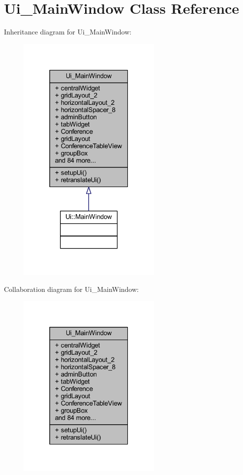 \hypertarget{class_ui___main_window}{}\section{Ui\+\_\+\+Main\+Window Class Reference}
\label{class_ui___main_window}


Inheritance diagram for Ui\+\_\+\+Main\+Window\+:
\nopagebreak
\begin{figure}[H]
\begin{center}
\leavevmode
\includegraphics[width=199pt]{class_ui___main_window__inherit__graph}
\end{center}
\end{figure}


Collaboration diagram for Ui\+\_\+\+Main\+Window\+:
\nopagebreak
\begin{figure}[H]
\begin{center}
\leavevmode
\includegraphics[width=199pt]{class_ui___main_window__coll__graph}
\end{center}
\end{figure}
